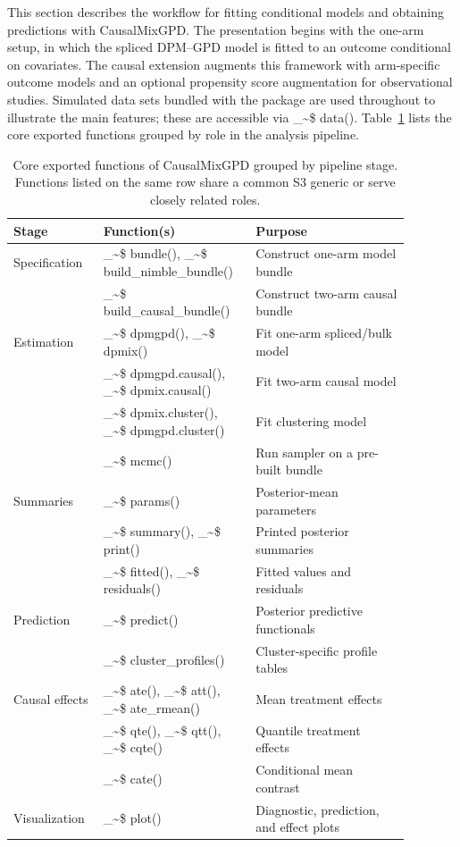 \documentclass[preprint,12pt,authoryear]{elsarticle}
\makeatletter
\newcommand{\pkg}[1]{\textsf{#1}}
\newcommand\code{\bgroup\@makeother\_\@makeother\~\@makeother\$\@codex}
\def\@codex#1{{\normalfont\ttfamily\hyphenchar\font=-1 #1}\egroup}
\makeatother
\begin{document}
This section describes the workflow for fitting conditional models and
obtaining predictions with \pkg{CausalMixGPD}.  The presentation
begins with the one-arm setup, in which the spliced DPM--GPD model is
fitted to an outcome conditional on covariates. The causal extension augments this
framework with arm-specific outcome models and an optional propensity
score augmentation for observational studies.
Simulated data sets bundled with the package are used throughout to
illustrate the main features; these are accessible via
\code{data()}.
Table~\ref{tab:function-overview} lists the core exported functions
grouped by role in the analysis pipeline.

\begin{table}[!htbp]
\centering
\small
\caption[Core exported functions of \pkg{CausalMixGPD}]{Core exported
  functions of \pkg{CausalMixGPD} grouped by pipeline stage.
  Functions listed on the same row share a common S3 generic or
  serve closely related roles.}
\label{tab:function-overview}
{
\renewcommand{\arraystretch}{1.08}
\begin{tabular}{
  @{}>{\raggedright\arraybackslash}p{0.20\linewidth}
  >{\raggedright\arraybackslash}p{0.32\linewidth}
  >{\raggedright\arraybackslash}p{0.36\linewidth}@{}
}
\toprule
Stage & Function(s) & Purpose \\
\midrule
Specification &
  \code{bundle()}, \code{build\_nimble\_bundle()} &
  Construct one-arm model bundle \\
 &
  \code{build\_causal\_bundle()} &
  Construct two-arm causal bundle \\
\midrule
Estimation &
  \code{dpmgpd()}, \code{dpmix()} &
  Fit one-arm spliced/bulk model \\
 &
  \code{dpmgpd.causal()}, \code{dpmix.causal()} &
  Fit two-arm causal model \\
 &
  \code{dpmix.cluster()}, \code{dpmgpd.cluster()} &
  Fit clustering model \\
 &
  \code{mcmc()} &
  Run sampler on a pre-built bundle \\
\midrule
Summaries &
  \code{params()} &
  Posterior-mean parameters \\
 &
  \code{summary()}, \code{print()} &
  Printed posterior summaries \\
 &
  \code{fitted()}, \code{residuals()} &
  Fitted values and residuals \\
\midrule
Prediction &
  \code{predict()} &
  Posterior predictive functionals \\
 &
  \code{cluster\_profiles()} &
  Cluster-specific profile tables \\
\midrule
Causal effects &
  \code{ate()}, \code{att()}, \code{ate\_rmean()} &
  Mean treatment effects \\
 &
  \code{qte()}, \code{qtt()}, \code{cqte()} &
  Quantile treatment effects \\
 &
  \code{cate()} &
  Conditional mean contrast \\
\midrule
Visualization &
  \code{plot()} &
  Diagnostic, prediction, and effect plots \\
\bottomrule
\end{tabular}
}
\end{table}
\end{document}
